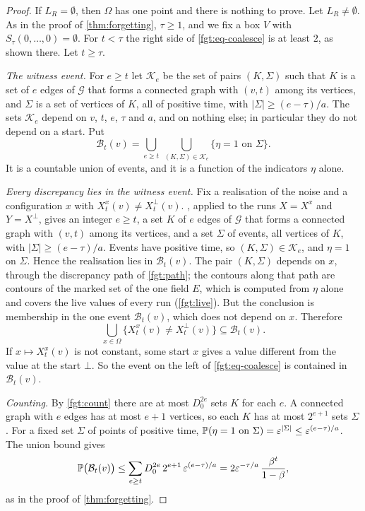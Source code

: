 \begin{proof}
If $L_R=\emptyset$, then $\Omega$ has one point and there is nothing to prove. Let $L_R\ne\emptyset$. As in the proof of \cref{thm:forgetting}, $\tau\ge1$, and we fix a box $V$ with $S_\tau(0,\dots,0)=\emptyset$. For $t<\tau$ the right side of \eqref{fgt:eq-coalesce} is at least $2$, as shown there. Let $t\ge\tau$.

\emph{The witness event.} For $e\ge t$ let $\mathcal K_e$ be the set of pairs $(K,\Sigma)$ such that $K$ is a set of $e$ edges of $\mathcal G$ that forms a connected graph with $(v,t)$ among its vertices, and $\Sigma$ is a set of vertices of $K$, all of positive time, with $|\Sigma|\ge(e-\tau)/a$. The sets $\mathcal K_e$ depend on $v$, $t$, $e$, $\tau$ and $a$, and on nothing else; in particular they do not depend on a start. Put
\[
\mathcal B_t(v)=\bigcup_{e\ge t}\ \bigcup_{(K,\Sigma)\in\mathcal K_e}\bigl\{\eta=1\text{ on }\Sigma\bigr\}.
\]
It is a countable union of events, and it is a function of the indicators $\eta$ alone.

\emph{Every discrepancy lies in the witness event.} Fix a realisation of the noise and a configuration $x$ with $X^x_t(v)\ne X^\bot_t(v)$. , applied to the runs $X=X^x$ and $Y=X^\bot$, gives an integer $e\ge t$, a set $K$ of $e$ edges of $\mathcal G$ that forms a connected graph with $(v,t)$ among its vertices, and a set $\Sigma$ of events, all vertices of $K$, with $|\Sigma|\ge(e-\tau)/a$. Events have positive time, so $(K,\Sigma)\in\mathcal K_e$, and $\eta=1$ on $\Sigma$. Hence the realisation lies in $\mathcal B_t(v)$. The pair $(K,\Sigma)$ depends on $x$, through the discrepancy path of \cref{fgt:path}; the contours along that path are contours of the marked set of the one field $E$, which is computed from $\eta$ alone and covers the live values of every run (\cref{fgt:live}). But the conclusion is membership in the one event $\mathcal B_t(v)$, which does not depend on $x$. Therefore
\[
\bigcup_{x\in\Omega}\bigl\{X^x_t(v)\ne X^\bot_t(v)\bigr\}\subseteq\mathcal B_t(v).
\]
If $x\mapsto X^x_t(v)$ is not constant, some start $x$ gives a value different from the value at the start $\bot$. So the event on the left of \eqref{fgt:eq-coalesce} is contained in $\mathcal B_t(v)$.

\emph{Counting.} By \cref{fgt:count} there are at most $D_0^{2e}$ sets $K$ for each $e$. A connected graph with $e$ edges has at most $e+1$ vertices, so each $K$ has at most $2^{e+1}$ sets $\Sigma$. For a fixed set $\Sigma$ of points of positive time, $\mathbb{P}(\eta=1\text{ on }\Sigma)=\varepsilon^{|\Sigma|}\le\varepsilon^{(e-\tau)/a}$. The union bound gives
\[
\mathbb{P}\bigl(\mathcal B_t(v)\bigr)\le\sum_{e\ge t}D_0^{2e}\,2^{e+1}\,\varepsilon^{(e-\tau)/a}=2\varepsilon^{-\tau/a}\,\frac{\beta^t}{1-\beta},
\]
as in the proof of \cref{thm:forgetting}.
\end{proof}

